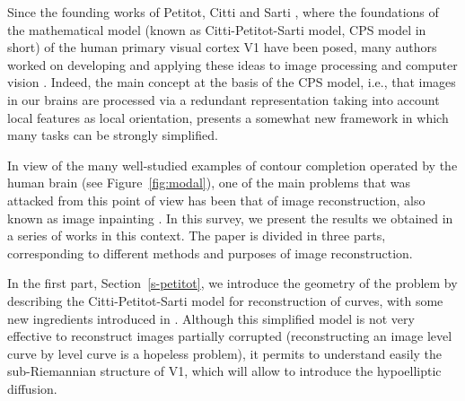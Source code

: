 \documentclass[proc]{edpsmath}
\begin{document}


Since the founding works of Petitot, Citti and Sarti \cite{petitot,citti-sarti}, where the foundations of the mathematical model (known as Citti-Petitot-Sarti model, CPS model in short) of the human primary visual cortex V1 have been posed, many authors worked on developing and applying these ideas to image processing and computer vision \cite{Duits2010,Duits2010a,Sanguinetti,Bredies13,Hladky}. Indeed, the main concept at the basis of the CPS model, i.e., that images in our brains are processed via a redundant representation taking into account local features as local orientation, presents a somewhat new framework in which many tasks can be strongly simplified.

In view of the many well-studied examples of contour completion operated by the human brain (see Figure~\ref{fig:modal}), one of the main problems that was attacked from this point of view has been that of image reconstruction, also known as image inpainting \cite{Bertalmio2000,Masnou2002,Chan2002,Criminisi2004a}.
In this survey, we present the results we obtained in a series of works \cite{Boscain2012a, Remizov2013, Boscain2014, ahe, gros-papier} in this context. The paper is divided in three parts, corresponding to different methods and purposes of image reconstruction.

In the first part, Section~\ref{s-petitot}, we introduce the geometry of the problem by describing the Citti-Petitot-Sarti model for reconstruction of curves, with some new ingredients introduced in \cite{Boscain2012a}. Although this simplified model is not very effective to reconstruct images partially corrupted (reconstructing an image level curve by level curve is a hopeless problem), it permits to understand easily the sub-Riemannian structure of V1, which will allow to introduce the hypoelliptic diffusion.
\end{document}
